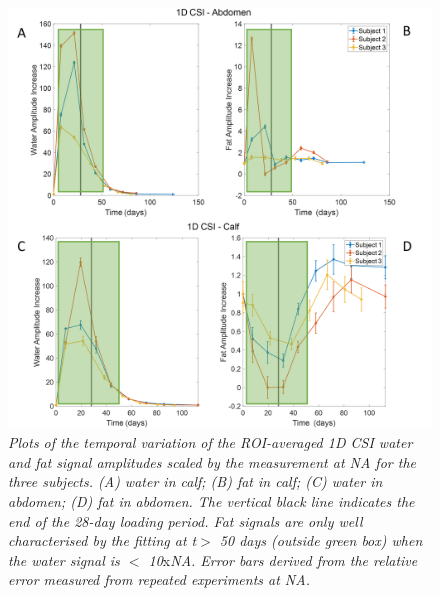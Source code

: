 \begin{figure}
    \centering
    \includegraphics[width=1\textwidth]{Figures/Lipid/1DCSI_Amplitude.png}
    \caption{\textit{Plots of the temporal variation of the \ac{ROI}-averaged 1D \ac{CSI} water and fat signal amplitudes scaled by the measurement at NA for the three subjects. (A) water in calf; (B) fat in calf; (C) water in abdomen; (D) fat in abdomen. The vertical black line indicates the end of the 28-day loading period. Fat signals are only well characterised by the fitting at t$>$ 50 days (outside green box) when the water signal is $<$ 10}x\textit{\ac{NA}.  Error bars derived from the relative error measured from repeated experiments at NA.}}
    \label{fig:Lip:1DCSI}
\end{figure}

